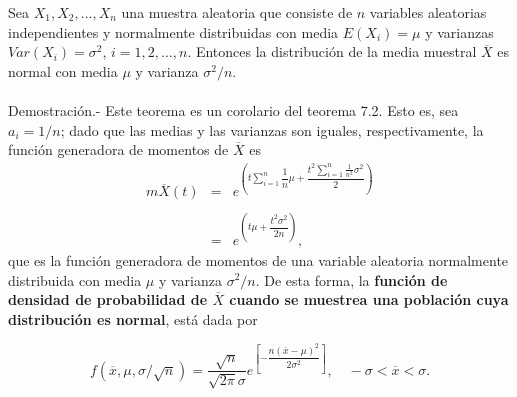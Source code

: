 \begin{teo}
    Sea $X_1,X_2,\ldots,X_n$ una muestra aleatoria que consiste de $n$ variables aleatorias independientes y normalmente distribuidas con media $E(X_i)=\mu$ y varianzas $Var(X_i)=\sigma^2$, $i=1,2,\ldots,n$. Entonces la distribución de la media muestral $\overline{X}$ es normal con media $\mu$ y varianza $\sigma^2/n.$\\\\
	Demostración.-\; Este teorema es un corolario del teorema 7.2. Esto es, sea $a_i=1/n$; dado que las medias y las varianzas son iguales, respectivamente, la función generadora de momentos de $\overline{X}$ es
	$$\begin{array}{rcl}
	    m\overline{X}(t) &=&  e^{\left(t\displaystyle\sum_{i=1}^n \dfrac{1}{n}\mu+\dfrac{t^2\displaystyle\sum_{i=1}^n \frac{1}{n^2}\sigma^2}{2}\right)}\\\\
			     &=&e^{\left(t\mu+\dfrac{t^2\sigma^2}{2n}\right)},
	\end{array}$$
	que es la función generadora de momentos de una variable aleatoria normalmente distribuida con media $\mu$ y varianza $\sigma^2/n$. De esta forma, la \textbf{\boldmath función de densidad de probabilidad de $\overline{X}$ cuando se muestrea una población cuya distribución es normal}, está dada por
	\begin{tcolorbox}
	    $$f\left(\overline{x},\mu,\sigma/\sqrt{n}\right)=\dfrac{\sqrt{n}}{\sqrt{2\pi}\sigma}e^{\left[-\dfrac{n(\overline{x}-\mu)^2}{2\sigma^2}\right]}, \quad -\sigma<\overline{x}<\sigma.$$
	\end{tcolorbox}
\end{teo}

